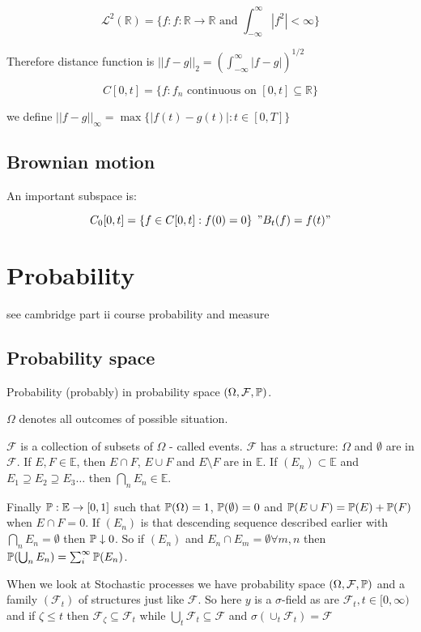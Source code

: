 $$
\mathcal{L}^2(\mathbb{R})=\{f:f:\mathbb{R}\rightarrow\mathbb{R}\text{ and }\int_{-\infty}^{\infty}|f^2|<\infty\}
$$

Therefore distance function is $||f-g||_2=(\int_{-\infty}^{\infty}|f-g|)^{1/2}$


$$
C[0,t]=\{ f:f_n \text{ continuous on }[0,t]\subseteq\mathbb{R}   \}
$$

we define $||f-g||_\infty=\max\{  |f(t)-g(t)|:t\in[0,T]  \}$

\subsection{Brownian motion}

An important subspace is:

$$
C_0[0,t]=\{ f\in C[0,t]:f(0)=0 \} \:\: "B_t(f)=f(t)"
$$

\section{Probability}

see cambridge part ii course probability and measure

\subsection{Probability space}

Probability (probably) in probability space $(\Omega, \mathcal{F}, \mathbb{P})$. 

$\Omega$ denotes all outcomes of possible situation.

$\mathcal{F}$ is a collection of subsets of $\Omega$ - called events. $\mathcal{F}$ has a structure: $\Omega$ and $\emptyset$ are in $\mathcal{F}$. If $E,F\in\mathbb{E}$, then $E\cap F$, $E\cup F$ and $E\setminus F$ are in $\mathbb{E}$. If $(E_n)\subset\mathbb{E}$ and $E_1\supseteq E_2\supseteq E_3\dots $ then $\bigcap_n E_n\in\mathbb{E}$.

Finally $\mathbb{P}:\mathbb{E}\rightarrow[0,1]$ such that $\mathbb{P}(\Omega)=1$, $\mathbb{P}(\emptyset)=0$ and $\mathbb{P}(E\cup F)=\mathbb{P}(E)+\mathbb{P}(F)$ when $E\cap  F=0$. If $(E_n)$ is that descending sequence described earlier with $\bigcap_n E_n=\emptyset$ then $\mathbb{P}\downarrow 0$. So if $(E_n)$ and $E_n \cap E_m=\emptyset \forall m,n$ then $\mathbb{P}( \bigcup_n E_n )=\sum_i^{\infty}\mathbb{P}(E_n)$.

When we look at Stochastic processes we have probability space $(\Omega, \mathcal{F}, \mathbb{P})$ and a family $(\mathcal{F}_t)$ of structures just like $\mathcal{F}$. So here $y$ is a $\sigma$-field as are $\mathcal{F}_t, t\in[0,\infty)$ and if $\zeta\leq t$ then $\mathcal{F}_\zeta \subseteq\mathcal{F}_t$ while $\bigcup_t\mathcal{F}_t\subseteq\mathcal{F}$ and $\sigma(\cup_t\mathcal{F}_t)=\mathcal{F}$

